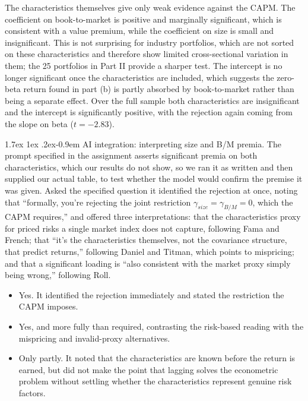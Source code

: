 \documentclass[11pt]{article}
\makeatletter
\renewcommand\paragraph{\@startsection{paragraph}{4}{0pt}%
  {1.7ex \@plus 1ex \@minus .2ex}{-0.9em}%
  {\normalfont\bfseries\normalsize\color{psink}}}
\newenvironment{tight}
  {\begin{itemize}\setlength{\itemsep}{3pt}\setlength{\parskip}{0pt}%
   \setlength{\topsep}{3pt}\setlength{\leftmargini}{1.4em}}
  {\end{itemize}}
\makeatother
\begin{document}
The characteristics themselves give only weak evidence against the CAPM. The
coefficient on book-to-market is positive and marginally significant, which is
consistent with a value premium, while the coefficient on size is small and
insignificant. This is not surprising for industry portfolios, which are not
sorted on these characteristics and therefore show limited cross-sectional
variation in them; the 25 portfolios in Part II provide a sharper test. The
intercept is no longer significant once the characteristics are included, which
suggests the zero-beta return found in part (b) is partly absorbed by
book-to-market rather than being a separate effect. Over the full sample both
characteristics are insignificant and the intercept is significantly positive,
with the rejection again coming from the slope on beta ($t = -2.83$).

\paragraph{AI integration: interpreting size and B/M premia.} The prompt
specified in the assignment asserts significant premia on both characteristics,
which our results do not show, so we ran it as written and then supplied our
actual table, to test whether the model would confirm the premise it was given.
Asked the specified question it identified the rejection at once, noting that
``formally, you're rejecting the joint restriction
$\gamma_{size} = \gamma_{B/M} = 0$, which the CAPM requires,'' and offered
three interpretations: that the characteristics proxy for priced risks a single
market index does not capture, following Fama and French; that ``it's the
characteristics themselves, not the covariance structure, that predict
returns,'' following Daniel and Titman, which points to mispricing; and that a
significant loading is ``also consistent with the market proxy simply being
wrong,'' following Roll.

\begin{tight}
\item[(i)] Yes. It identified the rejection immediately and stated the
restriction the CAPM imposes.
\item[(ii)] Yes, and more fully than required, contrasting the risk-based
reading with the mispricing and invalid-proxy alternatives.
\item[(iii)] Only partly. It noted that the characteristics are known before
the return is earned, but did not make the point that lagging solves the
econometric problem without settling whether the characteristics represent
genuine risk factors.
\end{tight}
\end{document}
